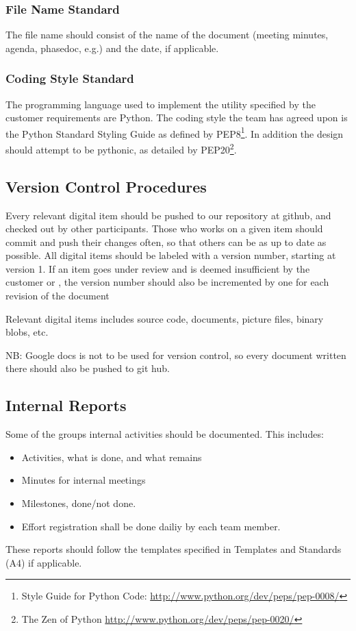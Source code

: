 \subsubsection{File Name Standard}
The file name should consist of the name of the document (meeting minutes,
agenda, phasedoc, e.g.) and the date, if applicable.

\subsubsection{Coding Style Standard}
The programming language used to implement the utility specified by the
customer requirements are Python. The coding style the team has agreed upon is
the Python Standard Styling Guide as defined by
PEP8\footnote{Style Guide for Python Code: \url{http://www.python.org/dev/peps/pep-0008/}}.
In addition the design should attempt to be pythonic, as detailed by
PEP20\footnote{The Zen of Python \url{http://www.python.org/dev/peps/pep-0020/}}.

\subsection{Version Control Procedures}
Every relevant digital item should be pushed to our repository at github, and checked out by other participants. Those who works on a given item should commit and push their changes often, so that others can be as up to date as possible. All digital items should be labeled with a version number, starting at version 1. If an item goes under review and is deemed insufficient by the customer or  , the version number should also be incremented by one for each revision of the document

Relevant digital items includes source code, documents, picture files, binary blobs, etc.

NB: Google docs is not to be used for version control, so every document written there should also be pushed to git hub.

\subsection{Internal Reports}
Some of the groups internal activities should be documented. This includes:
\begin{itemize}
	\item Activities, what is done, and what remains
	\item Minutes for internal meetings
	\item Milestones, done/not done.
	\item Effort registration shall be done dailiy by each team member.
\end{itemize}
These reports should follow the templates specified in Templates and Standards (A4) if applicable.


